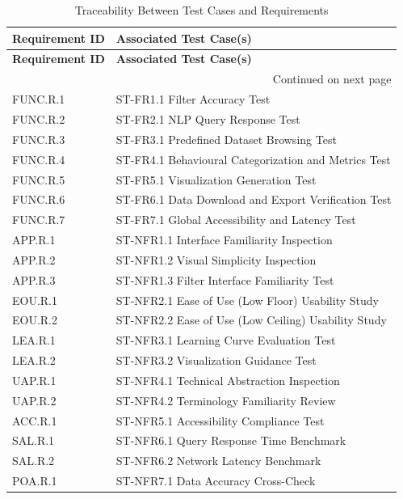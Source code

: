 \documentclass[12pt, titlepage]{article}
\begin{document}
\begin{flushleft}
\renewcommand{\arraystretch}{1.2}
\begin{longtable}{|l|p{10cm}|}
\caption{Traceability Between Test Cases and Requirements}
\label{tab:traceability} \\
\hline
\textbf{Requirement ID} & \textbf{Associated Test Case(s)} \\
\hline
\endfirsthead
\hline
\textbf{Requirement ID} & \textbf{Associated Test Case(s)} \\
\hline
\endhead
\hline \multicolumn{2}{r}{{Continued on next page}} \\
\endfoot
\hline
\endlastfoot

FUNC.R.1 & ST-FR1.1 Filter Accuracy Test \\
FUNC.R.2 & ST-FR2.1 NLP Query Response Test \\
FUNC.R.3 & ST-FR3.1 Predefined Dataset Browsing Test \\
FUNC.R.4 & ST-FR4.1 Behavioural Categorization and Metrics Test \\
FUNC.R.5 & ST-FR5.1 Visualization Generation Test \\
FUNC.R.6 & ST-FR6.1 Data Download and Export Verification Test \\
FUNC.R.7 & ST-FR7.1 Global Accessibility and Latency Test \\
APP.R.1 & ST-NFR1.1 Interface Familiarity Inspection \\
APP.R.2 & ST-NFR1.2 Visual Simplicity Inspection \\
APP.R.3 & ST-NFR1.3 Filter Interface Familiarity Test \\
EOU.R.1 & ST-NFR2.1 Ease of Use (Low Floor) Usability Study \\
EOU.R.2 & ST-NFR2.2 Ease of Use (Low Ceiling) Usability Study \\
LEA.R.1 & ST-NFR3.1 Learning Curve Evaluation Test \\
LEA.R.2 & ST-NFR3.2 Visualization Guidance Test \\
UAP.R.1 & ST-NFR4.1 Technical Abstraction Inspection \\
UAP.R.2 & ST-NFR4.2 Terminology Familiarity Review \\
ACC.R.1 & ST-NFR5.1 Accessibility Compliance Test \\
SAL.R.1 & ST-NFR6.1 Query Response Time Benchmark \\
SAL.R.2 & ST-NFR6.2 Network Latency Benchmark \\
POA.R.1 & ST-NFR7.1 Data Accuracy Cross-Check \\

\end{longtable}
\end{flushleft}
\end{document}
